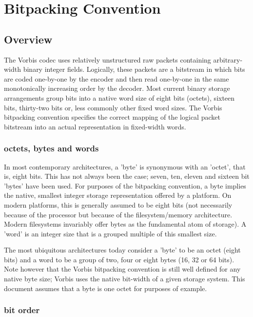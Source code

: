 \section{Bitpacking Convention} \label{vorbis:spec:bitpacking}

\subsection{Overview}

The Vorbis codec uses relatively unstructured raw packets containing
arbitrary-width binary integer fields.  Logically, these packets are a
bitstream in which bits are coded one-by-one by the encoder and then
read one-by-one in the same monotonically increasing order by the
decoder.  Most current binary storage arrangements group bits into a
native word size of eight bits (octets), sixteen bits, thirty-two bits
or, less commonly other fixed word sizes.  The Vorbis bitpacking
convention specifies the correct mapping of the logical packet
bitstream into an actual representation in fixed-width words.


\subsubsection{octets, bytes and words}

In most contemporary architectures, a 'byte' is synonymous with an
'octet', that is, eight bits.  This has not always been the case;
seven, ten, eleven and sixteen bit 'bytes' have been used.  For
purposes of the bitpacking convention, a byte implies the native,
smallest integer storage representation offered by a platform.  On
modern platforms, this is generally assumed to be eight bits (not
necessarily because of the processor but because of the
filesystem/memory architecture.  Modern filesystems invariably offer
bytes as the fundamental atom of storage).  A 'word' is an integer
size that is a grouped multiple of this smallest size.

The most ubiquitous architectures today consider a 'byte' to be an
octet (eight bits) and a word to be a group of two, four or eight
bytes (16, 32 or 64 bits).  Note however that the Vorbis bitpacking
convention is still well defined for any native byte size; Vorbis uses
the native bit-width of a given storage system. This document assumes
that a byte is one octet for purposes of example.

\subsubsection{bit order}


